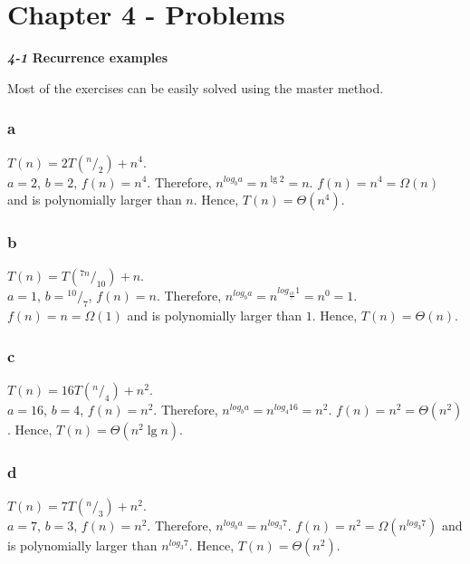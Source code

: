 \documentclass[8pt,a4paper]{article}
\begin{document}
\newcommand*\rfrac[2]{{}^{#1}\!/_{#2}}
\newcommand{\qed}{\hfill\blacksquare}

\section*{Chapter 4 - Problems}

\begin{framed}
\textbf{\textit{4-1} Recurrence examples}
\end{framed}

Most of the exercises can be easily solved using the master method.

\subsubsection*{a}

$T(n) = 2T(\rfrac{n}{2}) + n^{4}$. \\
$a = 2$, $b = 2$, $f(n) = n^{4}$. Therefore, $n^{log_{b} a} = n^{\lg 2} = n$.
$f(n) = n^{4} = \Omega(n)$ and is polynomially larger than $n$. Hence, $T(n) = \Theta(n^{4})$.

\subsubsection*{b}

$T(n) = T(\rfrac{7n}{10}) + n$. \\
$a = 1$, $b = \rfrac{10}{7}$, $f(n) = n$. Therefore, $n^{log_{b} a} = n^{log_{\frac{10}{7}} 1} = n^{0} = 1$.
$f(n) = n = \Omega(1)$ and is polynomially larger than $1$. Hence, $T(n) = \Theta(n)$.

\subsubsection*{c}

$T(n) = 16T(\rfrac{n}{4}) + n^{2}$. \\
$a = 16$, $b = 4$, $f(n) = n^{2}$. Therefore, $n^{log_{b} a} = n^{log_{4} 16} = n^{2}$.
$f(n) = n^{2} = \Theta(n^{2})$. Hence, $T(n) = \Theta(n^{2} \lg n)$.

\subsubsection*{d}

$T(n) = 7T(\rfrac{n}{3}) + n^{2}$. \\
$a = 7$, $b = 3$, $f(n) = n^{2}$. Therefore, $n^{log_{b} a} = n^{log_{3} 7}$.
$f(n) = n^{2} = \Omega(n^{log_{3} 7})$ and is polynomially larger than $n^{log_{3} 7}$.
Hence, $T(n) = \Theta(n^{2})$.
\end{document}
